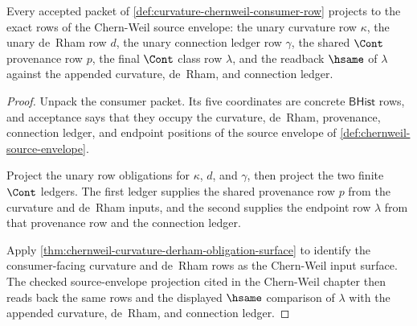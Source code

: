 \begin{theorem}
\label{thm:curvature-chernweil-consumer-envelope-projection}
Every accepted packet of \autoref{def:curvature-chernweil-consumer-row} projects to the exact rows of the Chern-Weil source envelope: the unary curvature row $\kappa$, the unary de~Rham row $d$, the unary connection ledger row $\gamma$, the shared $\Cont$ provenance row $p$, the final $\Cont$ class row $\lambda$, and the readback $\hsame$ of $\lambda$ against the appended curvature, de~Rham, and connection ledger.
\end{theorem}
\begin{proof}
Unpack the consumer packet. Its five coordinates are concrete $\mathsf{BHist}$ rows, and acceptance says that they occupy the curvature, de~Rham, provenance, connection ledger, and endpoint positions of the source envelope of \autoref{def:chernweil-source-envelope}.

Project the unary row obligations for $\kappa$, $d$, and $\gamma$, then project the two finite $\Cont$ ledgers. The first ledger supplies the shared provenance row $p$ from the curvature and de~Rham inputs, and the second supplies the endpoint row $\lambda$ from that provenance row and the connection ledger.

Apply \autoref{thm:chernweil-curvature-derham-obligation-surface} to identify the consumer-facing curvature and de~Rham rows as the Chern-Weil input surface. The checked source-envelope projection cited in the Chern-Weil chapter then reads back the same rows and the displayed $\hsame$ comparison of $\lambda$ with the appended curvature, de~Rham, and connection ledger.
\end{proof}

